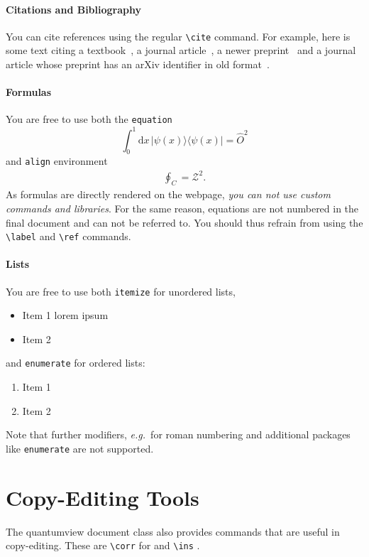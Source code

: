 \documentclass{quantumview}
\begin{document}
\paragraph{Citations and Bibliography} You can cite references using the regular \texttt{{\textbackslash}cite} command. For example, here is some text citing a textbook~\cite{NielsenChuang2000}, a journal article~\cite{Preskill2018}, a newer preprint~\cite{SchwarzhansLockErkerFriisHuber2020} and a journal article whose preprint has an arXiv identifier in old format~\cite{AcinBrussLewensteinSanpera2001}.

\paragraph{Formulas} You are free to use both the \texttt{equation}
\begin{equation}
    \int_0^1 \mathrm{d}x \, |\psi(x)\rangle \! \langle \psi(x)|= \hat{O}^2
\end{equation}
and \texttt{align} environment
\begin{align}
    \oint_C = \mathcal{Z}^2.
\end{align}
As formulas are directly rendered on the webpage, \emph{you can not use custom commands and libraries}. For the same reason, equations are not numbered in the final document and can not be referred to. You should thus refrain from using the \texttt{{\textbackslash}label} and \texttt{{\textbackslash}ref} commands.

\paragraph{Lists} You are free to use both \texttt{itemize} for unordered lists,
\begin{itemize}
    \item Item 1 lorem ipsum
    \item Item 2
\end{itemize}
and \texttt{enumerate} for ordered lists:
\begin{enumerate}
    \item Item 1
    \item Item 2
\end{enumerate}
Note that further modifiers, \emph{e.g.}\ for roman numbering and additional packages like \texttt{enumerate} are not supported.

\section{Copy-Editing Tools}
The quantumview document class also provides commands that are useful in copy-editing. These are \texttt{{\textbackslash}corr} for  and \texttt{{\textbackslash}ins} .



\end{document}
